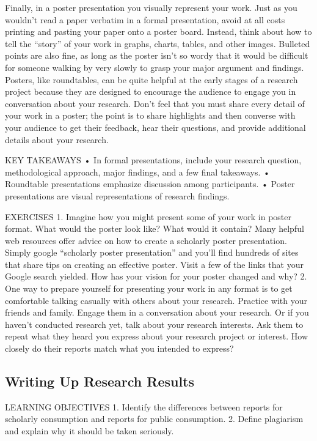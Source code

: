 Finally, in a poster presentation you visually represent your work. Just as you wouldn’t read a paper verbatim in a formal presentation, avoid at all costs printing and pasting your paper onto a poster board. Instead, think about how to tell the “story” of your work in graphs, charts, tables, and other images. Bulleted points are also fine, as long as the poster isn’t so wordy that it would be difficult for someone walking by very slowly to grasp your major argument and findings. Posters, like roundtables, can be quite helpful at the early stages of a research project because they are designed to encourage the audience to engage you in conversation about your research. Don’t feel that you must share every detail of your work in a poster; the point is to share highlights and then converse with your audience to get their feedback, hear their questions, and provide additional details about your research.

KEY TAKEAWAYS
• In formal presentations, include your research question, methodological approach, major findings, and a few final takeaways.
• Roundtable presentations emphasize discussion among participants.
• Poster presentations are visual representations of research findings.

EXERCISES
1. Imagine how you might present some of your work in poster format. What would the poster look like? What would it contain? Many helpful web resources offer advice on how to create a scholarly poster presentation. Simply google “scholarly poster presentation” and you’ll find hundreds of sites that share tips on creating an effective poster. Visit a few of the links that your Google search yielded. How has your vision for your poster changed and why?
2. One way to prepare yourself for presenting your work in any format is to get comfortable talking casually with others about your research. Practice with your friends and family. Engage them in a conversation about your research. Or if you haven’t conducted research yet, talk about your research interests. Ask them to repeat what they heard you express about your research project or interest. How closely do their reports match what you intended to express?

\subsection{Writing Up Research Results}

LEARNING OBJECTIVES
1. Identify the differences between reports for scholarly consumption and reports for public consumption.
2. Define plagiarism and explain why it should be taken seriously.


